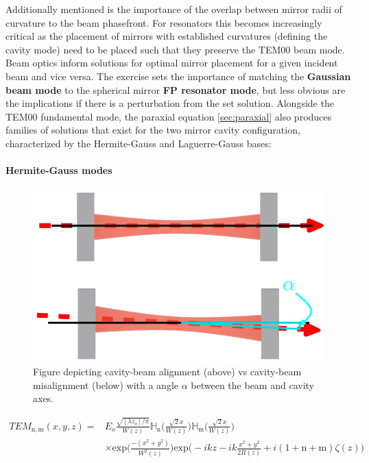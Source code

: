 Additionally mentioned is the importance of the overlap between mirror radii of curvature to the beam phasefront. For resonators this becomes increasingly critical as the placement of mirrors with established curvatures (defining the cavity mode) need to be placed such that they preserve the TEM00 beam mode. Beam optics inform solutions for optimal mirror placement for a given incident beam and vice versa. The exercise sets the importance of matching the \textbf{Gaussian beam mode} to the spherical mirror \textbf{FP resonator mode}, but less obvious are the implications if there is a perturbation from the set solution. Alongside the TEM00 fundamental mode, the paraxial equation \autoref{sec:paraxial} also produces families of solutions that exist for the two mirror cavity configuration, characterized by the Hermite-Gauss and Laguerre-Gauss bases:

\paragraph*{Hermite-Gauss modes}

\begin{figure}[H]
	\centering
	\includegraphics[width=.7\textwidth]{figs/INTRO/FP_misalignment.pdf}
	\caption{Figure depicting cavity-beam alignment (above) vs cavity-beam misalignment (below) with a angle $\alpha$ between the beam and cavity axes. }
	\label{fig:fp_misalignment}
\end{figure}

\begin{equation}\label{eq:HG_beam}
	\begin{split}
		TEM_\mathrm{n,m}(x,y,z) = & E_o \frac{\sqrt{[\lambda z_o] / \pi}}{W(z)}\mathbb{H}_\mathrm{n}\bigg(\frac{\sqrt{2}x}{W(z)}\bigg)\mathbb{H}_\mathrm{m}\bigg(\frac{\sqrt{2}x}{W(z)}\bigg)\\
					& \times \mathrm{exp}\bigg(\frac{-(x^2+y^2)}{W^2(z)}\bigg) \mathrm{exp}\bigg(-ikz - ik\frac{x^2 + y^2}{2R(z)} + i (1+\mathrm{n}+\mathrm{m})\zeta(z)\bigg)
	\end{split}
\end{equation}


